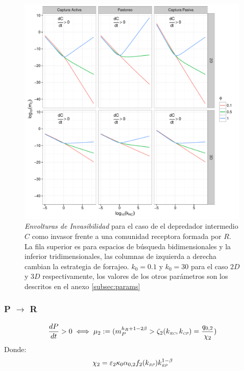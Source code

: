 \begin{figure}
  \centering
  \includegraphics[width = 0.99\textwidth]{./Plots/R-CInv.pdf}
  \caption[Invasibilidad R-C]{\emph{Envolturas de Invasibilidad} para el caso de el depredador intermedio $C$ como invasor frente a una comunidad receptora formada por $R$. La fila superior es para espacios de b\'usqueda bidimensionales y la inferior tridimensionales, las columnas de izquierda a derecha cambian la estrategia de forrajeo. $k_0 = 0.1$ y $k_0 = 30$ para el caso $2D$ y $3D$ respectivamente, los valores de los otros par\'ametros son los descritos en el anexo \ref{subsec:params}}
  \label{fig:R-CInv}
\end{figure}

\subsubsection{P $\to$ R}

\begin{equation}
  \frac{dP}{dt} >0 \iff \mu_2 := ( m_P^{h_R + 1 - 2\beta} > \zeta_2(k_{\textit{\tiny RC}},k_{\textit{\tiny CP}}) = \frac{q_{0,2}}{\chi_2} )
\end{equation}
Donde:
\begin{equation}
  \begin{aligned}
    \chi_2 &= \varepsilon_2 \kappa_0\alpha_{0,2} f_2(k_{\textit{\tiny RP}})k_{\textit{\tiny RP}}^{1-\beta} \\
  \end{aligned}
\end{equation}

